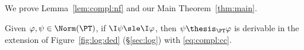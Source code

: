 \subsection{}
\label{sec:app:main}

We prove Lemma~\ref{lem:compl:nf} and our Main Theorem~\ref{thm:main}.


\begin{lemma}
\label{lem:app:compl:nf}
Given $\varphi,\psi \in \Norm(\PT)$,
if $\I\psi \sle \I\varphi$,
then $\psi \thesis_\PT \varphi$
is derivable in the extension of Figure~\ref{fig:log:ded} (\S\ref{sec:log})
with \eqref{eq:compl:cc}.
\end{lemma}


